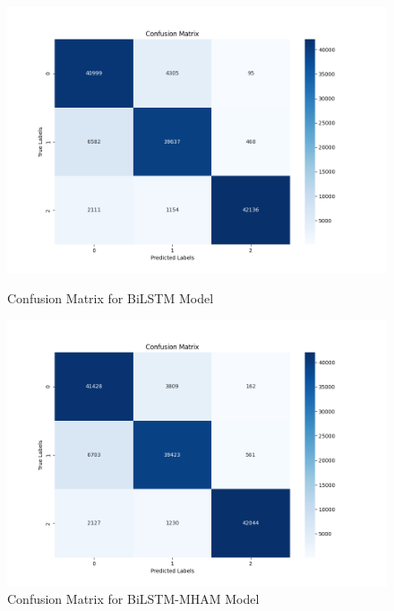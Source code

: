 \documentclass{article}
\begin{document}
\begin{figure}[H]
  \centering
  \begin{minipage}[b]{0.45\textwidth}
    \centering
    \includegraphics[width=0.9\linewidth]{LSTM_Text_Classifierconfusion_matrix_cnn.png}
    \caption{Confusion Matrix for BiLSTM Model}
    \label{fig:image1}
  \end{minipage}
  \hfill
  \begin{minipage}[b]{0.45\textwidth}
    \centering
    \includegraphics[width=0.9\linewidth]{LSTM_Multi_Head_Attentionconfusion_matrix_cnn.png}
    \caption{Confusion Matrix for BiLSTM-MHAM Model}
    \label{fig:image2}
  \end{minipage}
\end{figure}
\end{document}
